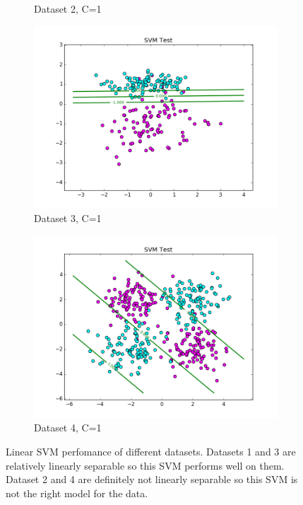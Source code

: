 \documentclass[10pt,twoside]{article}
\begin{document}
\begin{figure}
\begin{subfigure}[b]{0.25\textwidth}
                \caption{Dataset 2, C=1}
        \end{subfigure}%
        \begin{subfigure}[b]{0.25\textwidth}
                \centering
                \includegraphics[width=\linewidth]{Figures/P2/svm_data3_test_C1.png}
                \caption{Dataset 3, C=1}
        \end{subfigure}%
        \begin{subfigure}[b]{0.25\textwidth}
                \centering
                \includegraphics[width=\linewidth]{Figures/P2/svm_data4_test_C1.png}
                \caption{Dataset 4, C=1}
        \end{subfigure}
        \caption{Linear SVM perfomance of different datasets. Datasets 1 and 3 are relatively linearly separable so this SVM performs well on them. Dataset 2 and 4 are definitely not linearly separable so this SVM is not the right model for the data.}\label{fig:animals}
\end{figure}
\end{document}
